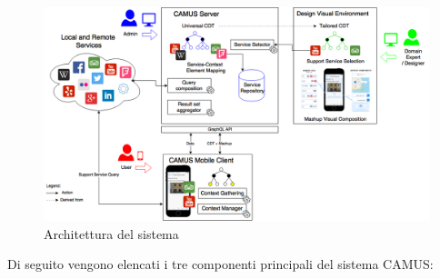 \begin{figure}[ht]
	\centering
	\includegraphics[width=\textwidth]{3-metodologia-camus/Immagini/architettura-generale.png}
	\caption{Architettura del sistema}\label{fig:architettura-sistema}
\end{figure}

Di seguito vengono elencati i tre componenti principali del sistema CAMUS:

